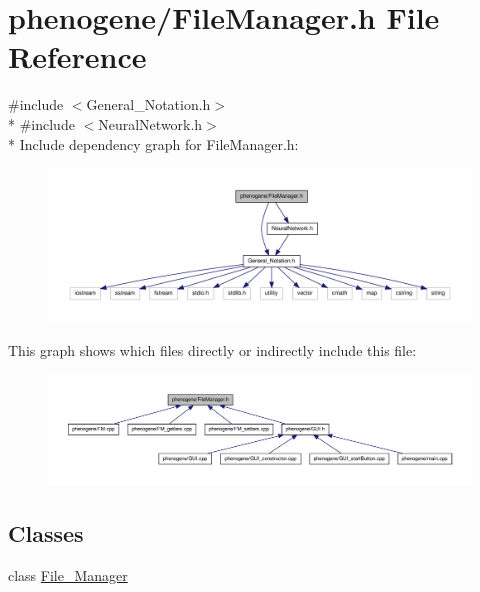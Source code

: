 \hypertarget{a00004}{\section{phenogene/\-File\-Manager.h File Reference}
\label{d0/d0b/a00004}
}
{\ttfamily \#include $<$General\-\_\-\-Notation.\-h$>$}\\*
{\ttfamily \#include $<$Neural\-Network.\-h$>$}\\*
Include dependency graph for File\-Manager.\-h\-:\nopagebreak
\begin{figure}[H]
\begin{center}
\leavevmode
\includegraphics[width=350pt]{d7/de0/a00022}
\end{center}
\end{figure}
This graph shows which files directly or indirectly include this file\-:\nopagebreak
\begin{figure}[H]
\begin{center}
\leavevmode
\includegraphics[width=350pt]{d3/d52/a00023}
\end{center}
\end{figure}
\subsection*{Classes}
\begin{DoxyCompactItemize}
\item 
class \hyperlink{a00001}{File\-\_\-\-Manager}
\end{DoxyCompactItemize}
